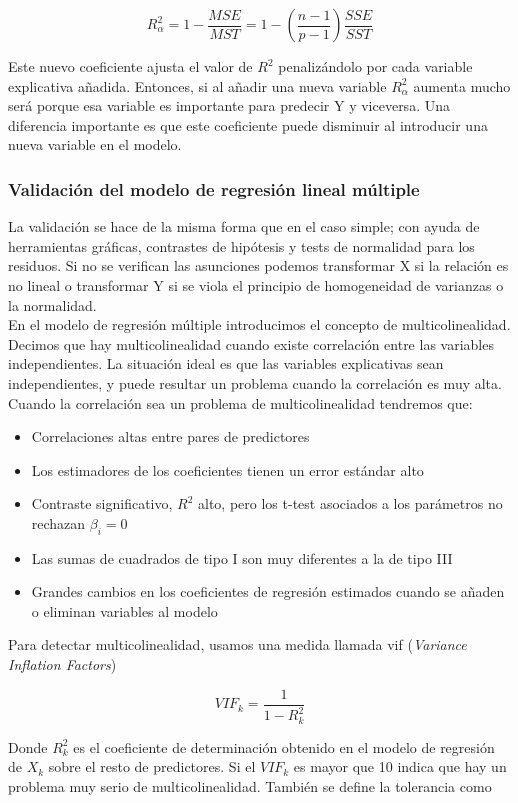 $$
R^2_\alpha=1-\frac{MSE}{MST}=1-\left(\frac{n-1}{p-1}\right)\frac{SSE}{SST}
$$

Este nuevo coeficiente ajusta el valor de $R^2$ penalizándolo por cada variable explicativa añadida. Entonces, si al añadir una nueva variable $R^2_\alpha$ aumenta mucho será porque esa variable es importante para predecir Y y viceversa. Una diferencia importante es que este coeficiente puede disminuir al introducir una nueva variable en el modelo.

\subsubsection{Validación del modelo de regresión lineal múltiple}

La validación se hace de la misma forma que en el caso simple; con ayuda de herramientas gráficas, contrastes de hipótesis y tests de normalidad para los residuos. Si no se verifican las asunciones podemos transformar X si la relación es no lineal o transformar Y si se viola el principio de homogeneidad de varianzas o la normalidad.\\
En el modelo de regresión múltiple introducimos el concepto de multicolinealidad. Decimos que hay multicolinealidad cuando existe correlación entre las variables independientes. La situación ideal es que las variables explicativas sean independientes, y puede resultar un problema cuando la correlación es muy alta. Cuando la correlación sea un problema de multicolinealidad tendremos que:

\begin{itemize}
    \item Correlaciones altas entre pares de predictores
    \item Los estimadores de los coeficientes tienen un error estándar alto
    \item Contraste significativo, $R^2$ alto, pero los t-test asociados a los parámetros no rechazan $\beta_i=0$
    \item Las sumas de cuadrados de tipo I son muy diferentes a la de tipo III
    \item Grandes cambios en los coeficientes de regresión estimados cuando se añaden o eliminan variables al modelo
\end{itemize}

Para detectar multicolinealidad, usamos una medida llamada vif (\textit{Variance Inflation Factors})

$$
VIF_k=\frac{1}{1-R^2_k}
$$

Donde $R^2_k$ es el coeficiente de determinación obtenido en el modelo de regresión de $X_k$ sobre el resto de predictores. Si el $VIF_k$ es mayor que 10 indica que hay un problema muy serio de multicolinealidad. También se define la tolerancia como

